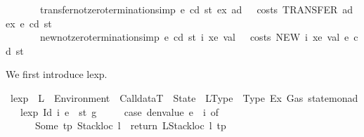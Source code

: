 \begin{isabellebody}
\ \ \ \ \ \ \ transfer{\isacharunderscore}{\kern0pt}not{\isacharunderscore}{\kern0pt}zero{\isacharbrackleft}{\kern0pt}termination{\isacharunderscore}{\kern0pt}simp{\isacharbrackright}{\kern0pt}{\isacharcolon}{\kern0pt}\ {\isachardoublequoteopen}{\isasymAnd}e\ cd\ st\ ex\ ad{\isachardot}{\kern0pt}\ {}\ {\isacharless}{\kern0pt}\ {\isacharparenleft}{\kern0pt}costs\ {\isacharparenleft}{\kern0pt}TRANSFER\ ad\ ex{\isacharparenright}{\kern0pt}\ e\ cd\ st{\isacharparenright}{\kern0pt}{\isachardoublequoteclose}\isanewline
\ \ \ \ \ \ \ new{\isacharunderscore}{\kern0pt}not{\isacharunderscore}{\kern0pt}zero{\isacharbrackleft}{\kern0pt}termination{\isacharunderscore}{\kern0pt}simp{\isacharbrackright}{\kern0pt}{\isacharcolon}{\kern0pt}\ {\isachardoublequoteopen}{\isasymAnd}e\ cd\ st\ i\ xe\ val{\isachardot}{\kern0pt}\ {}\ {\isacharless}{\kern0pt}\ {\isacharparenleft}{\kern0pt}costs\ {\isacharparenleft}{\kern0pt}NEW\ i\ xe\ val{\isacharparenright}{\kern0pt}\ e\ cd\ st{\isacharparenright}{\kern0pt}{\isachardoublequoteclose}\isanewline
{}%
\isadelimdocument
%
\endisadelimdocument
%
\isatagdocument
%
\isamarkuptrue%
%
\endisatagdocument
{\isafolddocument}%
%
\isadelimdocument
%
\endisadelimdocument
%
\begin{isamarkuptext}%
We first introduce lexp.%
\end{isamarkuptext}\isamarkuptrue%
\isamarkupfalse%
\ lexp\ {\isacharcolon}{\kern0pt}{\isacharcolon}{\kern0pt}\ {\isachardoublequoteopen}L\ {\isasymRightarrow}\ Environment\ {\isasymRightarrow}\ CalldataT\ {\isasymRightarrow}\ State\ {\isasymRightarrow}\ {\isacharparenleft}{\kern0pt}LType\ {\isacharasterisk}{\kern0pt}\ Type{\isacharcomma}{\kern0pt}\ Ex{\isacharcomma}{\kern0pt}\ Gas{\isacharparenright}{\kern0pt}\ state{\isacharunderscore}{\kern0pt}monad{\isachardoublequoteclose}\isanewline
\ \ \ {\isachardoublequoteopen}lexp\ {\isacharparenleft}{\kern0pt}Id\ i{\isacharparenright}{\kern0pt}\ e\ {\isacharunderscore}{\kern0pt}\ st\ g\ {\isacharequal}{\kern0pt}\isanewline
\ \ \ \ {\isacharparenleft}{\kern0pt}case\ {\isacharparenleft}{\kern0pt}denvalue\ e{\isacharparenright}{\kern0pt}\ {\isachardollar}{\kern0pt}{\isachardollar}{\kern0pt}\ i\ of\isanewline
\ \ \ \ \ \ Some\ {\isacharparenleft}{\kern0pt}tp{\isacharcomma}{\kern0pt}\ {\isacharparenleft}{\kern0pt}Stackloc\ l{\isacharparenright}{\kern0pt}{\isacharparenright}{\kern0pt}\ {\isasymRightarrow}\ return\ {\isacharparenleft}{\kern0pt}LStackloc\ l{\isacharcomma}{\kern0pt}\ tp{\isacharparenright}{\kern0pt}\isanewline

\end{isabellebody}
